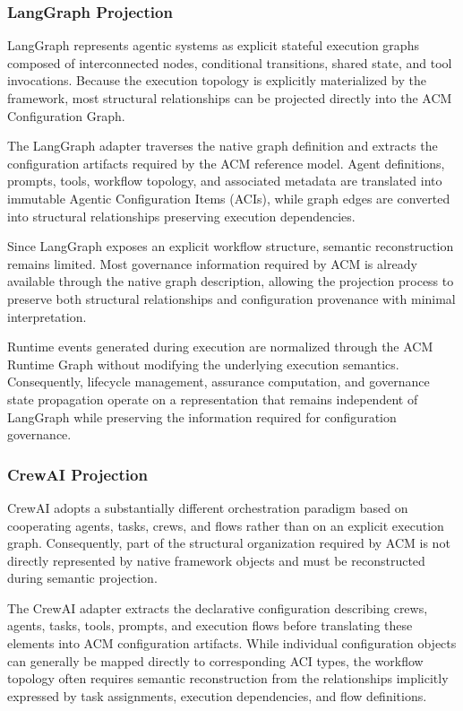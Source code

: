 \documentclass[10pt]{article}
\begin{document}
\subsubsection{LangGraph Projection}

LangGraph represents agentic systems as explicit stateful execution graphs composed of interconnected nodes, conditional transitions, shared state, and tool invocations. Because the execution topology is explicitly materialized by the framework, most structural relationships can be projected directly into the ACM Configuration Graph.

The LangGraph adapter traverses the native graph definition and extracts the configuration artifacts required by the ACM reference model. Agent definitions, prompts, tools, workflow topology, and associated metadata are translated into immutable Agentic Configuration Items (ACIs), while graph edges are converted into structural relationships preserving execution dependencies.

Since LangGraph exposes an explicit workflow structure, semantic reconstruction remains limited. Most governance information required by ACM is already available through the native graph description, allowing the projection process to preserve both structural relationships and configuration provenance with minimal interpretation.

Runtime events generated during execution are normalized through the ACM Runtime Graph without modifying the underlying execution semantics. Consequently, lifecycle management, assurance computation, and governance state propagation operate on a representation that remains independent of LangGraph while preserving the information required for configuration governance.


\subsubsection{CrewAI Projection}

CrewAI adopts a substantially different orchestration paradigm based on cooperating agents, tasks, crews, and flows rather than on an explicit execution graph. Consequently, part of the structural organization required by ACM is not directly represented by native framework objects and must be reconstructed during semantic projection.

The CrewAI adapter extracts the declarative configuration describing crews, agents, tasks, tools, prompts, and execution flows before translating these elements into ACM configuration artifacts. While individual configuration objects can generally be mapped directly to corresponding ACI types, the workflow topology often requires semantic reconstruction from the relationships implicitly expressed by task assignments, execution dependencies, and flow definitions.
\end{document}
